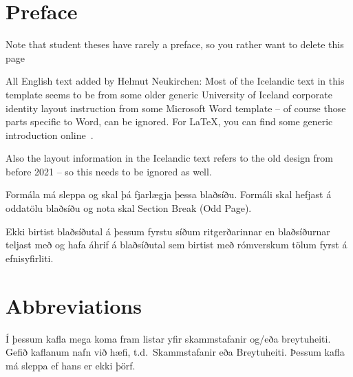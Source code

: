 \documentclass[a4paper,12pt,twoside,BCOR=10mm]{scrbook}
\begin{document}
\newpage %


\chapter*{Preface}
Note that student theses have rarely a preface, so you rather want to delete this page

All English text added by Helmut Neukirchen:
Most of the Icelandic text in this template seems to be from some
older generic University of Iceland corporate identity layout
instruction from some Microsoft Word template -- of course those parts
specific to Word, can be ignored. For \LaTeX, you can find some
generic introduction online~\mbox{\cite{lshort,latex-tutorial}}.%

Also the layout information in the Icelandic text refers to the old
design from before 2021 -- so this needs to be ignored as well.

Formála má sleppa og skal þá fjarlægja þessa blaðsíðu. Formáli skal hefjast á oddatölu blaðsíðu og nota skal Section Break (Odd Page).

Ekki birtist blaðsíðutal á þessum fyrstu síðum ritgerðarinnar en blaðsíðurnar teljast með og hafa áhrif á blaðsíðutal sem birtist með rómverskum tölum fyrst á efnisyfirliti.


\hypersetup{pageanchor=true}
\tableofcontents
\listoffigures
\listoftables

\chapter*{Abbreviations}

Í þessum kafla mega koma fram listar yfir skammstafanir og/eða breytuheiti. Gefið kaflanum nafn við hæfi, t.d.\ Skammstafanir eða Breytuheiti. Þessum kafla má sleppa ef hans er ekki þörf. \\
\end{document}
